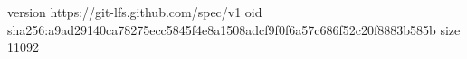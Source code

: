 version https://git-lfs.github.com/spec/v1
oid sha256:a9ad29140ca78275ecc5845f4e8a1508adcf9f0f6a57c686f52c20f8883b585b
size 11092
